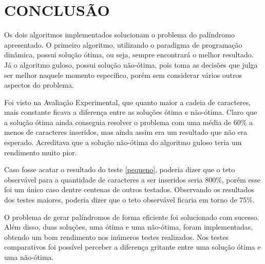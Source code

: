 \documentclass[12pt]{article}
\begin{document}
\section{CONCLUSÃO}
\label{conclusao}

    Os dois algoritmos implementados solucionam o problema do palíndromo apresentado. O primeiro algoritmo, utilizando o paradigma de programação dinâmica, possui solução ótima, ou seja, sempre encontrará o melhor resultado. Já o algoritmo guloso, possui solução não-ótima, pois toma as decisões que julga ser melhor naquele momento específico, porém sem considerar vários outros aspectos do problema.

    Foi visto na Avaliação Experimental, que quanto maior a cadeia de caracteres, mais constante ficava a diferença entre as soluções ótima e não-ótima. Claro que a solução ótima ainda conseguia resolver o problema com uma média de $60\%$ a menos de caracteres inseridos, mas ainda assim era um resultado que não era esperado. Acreditava que a solução não-ótima do algoritmo guloso teria um rendimento muito pior.

    Caso fosse acatar o resultado do teste \ref{pequeno}, poderia dizer que o teto observável para a quantidade de caracteres a ser inseridos seria $800\%$, porém esse foi um único caso dentre centenas de outros testados. Observando os resultados dos testes maiores, poderia dizer que o teto observável ficaria em torno de $75\%$.

    O problema de gerar palíndromos de forma eficiente foi solucionado com sucesso. Além disso, duas soluções, uma ótima e uma não-ótima, foram implementadas, obtendo um bom rendimento nos inúmeros testes realizados. Nos testes comparativos foi possível perceber a diferença gritante entre uma solução ótima e uma não-ótima.



\end{document}
